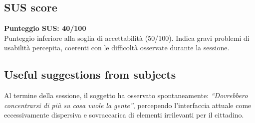 \documentclass[11pt,a4paper]{article}
\begin{document}
\subsection*{SUS score}
\begin{tcolorbox}[colback=backgroundColor,colframe=borderColor,arc=2mm]
\textbf{Punteggio SUS: 40/100}\\[0.2cm]
\small Punteggio inferiore alla soglia di accettabilità
(50/100). Indica gravi problemi di usabilità percepita,
coerenti con le difficoltà osservate durante la sessione.
\end{tcolorbox}

\subsection*{Useful suggestions from subjects}
\begin{tcolorbox}[colback=backgroundColor,colframe=borderColor,arc=2mm]
Al termine della sessione, il soggetto ha osservato spontaneamente: \textit{``Dovrebbero concentrarsi di più su cosa vuole la gente''}, percependo l'interfaccia attuale come eccessivamente dispersiva e sovraccarica di elementi irrilevanti per il cittadino. 
\end{tcolorbox}
\end{document}
